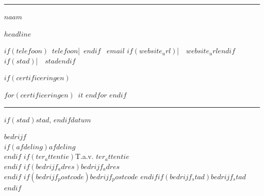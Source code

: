 \documentclass[a4paper, 11pt]{article}
\begin{document}
{\color{accent}\rule{\linewidth}{2pt}}

\vspace{0.3em}

{\LARGE\bfseries\color{accent} $naam$}

\vspace{0.1em}

{\small\color{grijs}\itshape $headline$}

\vspace{0.3em}

{\small%
$if(telefoon)$\faPhone*~\href{tel:$telefoon$}{$telefoon$}\quad\textcolor{accent}{|}~$endif$%
\faEnvelope~\href{mailto:$email$}{$email$}%
$if(website_url)$\quad\textcolor{accent}{|}~\faGlobe~\href{https://$website_url$}{$website_url$}$endif$%
$if(stad)$\quad\textcolor{accent}{|}~\faMapMarker~$stad$$endif$%
}

$if(certificeringen)$
\vspace{0.2em}

{\footnotesize\setlength{\parskip}{3pt}%
$for(certificeringen)$\colorbox{accentlight}{\color{accent}\faCertificate~$it$} $endfor$%
}
$endif$

\vspace{0.2em}

{\color{accent}\rule{\linewidth}{0.5pt}}

\vspace{0.25cm}

\begin{flushright}
$if(stad)$$stad$, $endif$$datum$
\end{flushright}

\vspace{0.25cm}

\textbf{$bedrijf$}\\
$if(afdeling)$$afdeling$\\$endif$%
$if(ter_attentie)$T.a.v. $ter_attentie$\\$endif$%
$if(bedrijf_adres)$$bedrijf_adres$\\$endif$%
$if(bedrijf_postcode)$$bedrijf_postcode$ $endif$$if(bedrijf_stad)$$bedrijf_stad$$endif$
\end{document}
